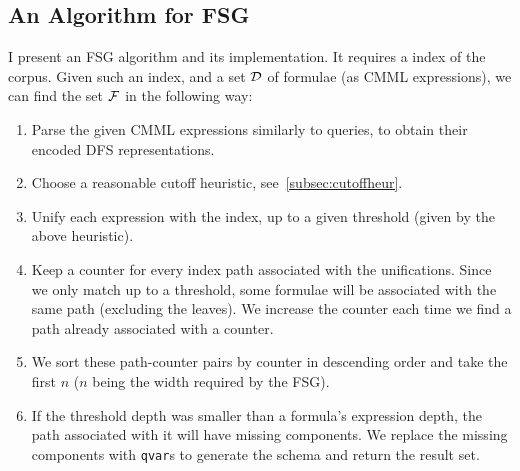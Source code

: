 \subsection{An Algorithm for FSG}\label{subsec:fsgAlgorithm}
I present an FSG algorithm and its implementation. It requires a \MWS index of
the corpus. Given such an index, and a set $\mathcal{D}$ of formulae (as CMML
expressions), we can find the set $\mathcal{F}$ in the following way:
\begin{enumerate}
    \item Parse the given CMML expressions similarly to \MWS queries,
        to obtain their encoded DFS representations.
    \item Choose a reasonable cutoff heuristic, see~\ref{subsec:cutoffheur}.
    \item Unify each expression with the index, up to a given threshold (given by
        the above heuristic).
    \item Keep a counter for every index path associated with the unifications.
        Since we only match up to a threshold, some formulae will be associated
        with the same path (excluding the leaves).
        We increase the counter each time we find a path already associated
        with a counter.
    \item We sort these path-counter pairs by counter in descending order and
        take the first $n$ ($n$ being the width required by the FSG).
    \item If the threshold depth was smaller than a formula's expression
        depth, the path associated with it will have missing components. We
        replace the missing components with \lstinline|qvar|s to generate the
        schema and return the result set.
\end{enumerate}

